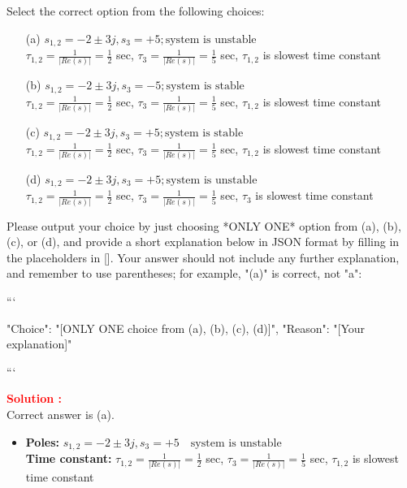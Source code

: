 \documentclass[12pt]{article}
\begin{document}
Select the correct option from the following choices:
\begin{itemize}
    \item[(a)]  \(s_{1,2} = -2 \pm 3j, s_3 = +5; \text{system is unstable}\)\\
     \(\tau_{1,2} = \frac{1}{|Re(s)|} = \frac{1}{2}\) sec, \(\tau_3 = \frac{1}{|Re(s)|} = \frac{1}{5}\) sec, \(\tau_{1,2}\) is slowest time constant
    \item[(b)]  \(s_{1,2} = -2 \pm 3j, s_3 = -5; \text{system is stable}\)\\
     \(\tau_{1,2} = \frac{1}{|Re(s)|} = \frac{1}{2}\) sec, \(\tau_3 = \frac{1}{|Re(s)|} = \frac{1}{5}\) sec, \(\tau_{1,2}\) is slowest time constant
    \item[(c)]  \(s_{1,2} = -2 \pm 3j, s_3 = +5; \text{system is stable}\)\\
     \(\tau_{1,2} = \frac{1}{|Re(s)|} = \frac{1}{2}\) sec, \(\tau_3 = \frac{1}{|Re(s)|} = \frac{1}{5}\) sec, \(\tau_{1,2}\) is slowest time constant
    \item[(d)]  \(s_{1,2} = -2 \pm 3j, s_3 = +5; \text{system is unstable}\)\\
     \(\tau_{1,2} = \frac{1}{|Re(s)|} = \frac{1}{2}\) sec, \(\tau_3 = \frac{1}{|Re(s)|} = \frac{1}{5}\) sec, \(\tau_{3}\) is slowest time constant
\end{itemize}




Please output your choice by just choosing *ONLY ONE* option from (a), (b), (c), or (d), and provide a short explanation below in JSON format by filling in the placeholders in []. Your answer should not include any further explanation, and remember to use parentheses; for example, "(a)" is correct, not "a":

```

{
"Choice": "[ONLY ONE choice from (a), (b), (c), (d)]",
"Reason": "[Your explanation]"
}

```

\textbf{\textcolor{red}{Solution :}} \\
Correct answer is (a).\\
\begin{itemize}
 \item   \textbf{Poles:} \(s_{1,2} = -2 \pm 3j, s_3 = +5 \quad \text{system is unstable}\)\\
    \textbf{Time constant:} \(\tau_{1,2} = \frac{1}{|Re(s)|} = \frac{1}{2}\) sec, \(\tau_3 = \frac{1}{|Re(s)|} = \frac{1}{5}\) sec, \(\tau_{1,2}\) is slowest time constant
\end{itemize}
\clearpage
\end{document}
